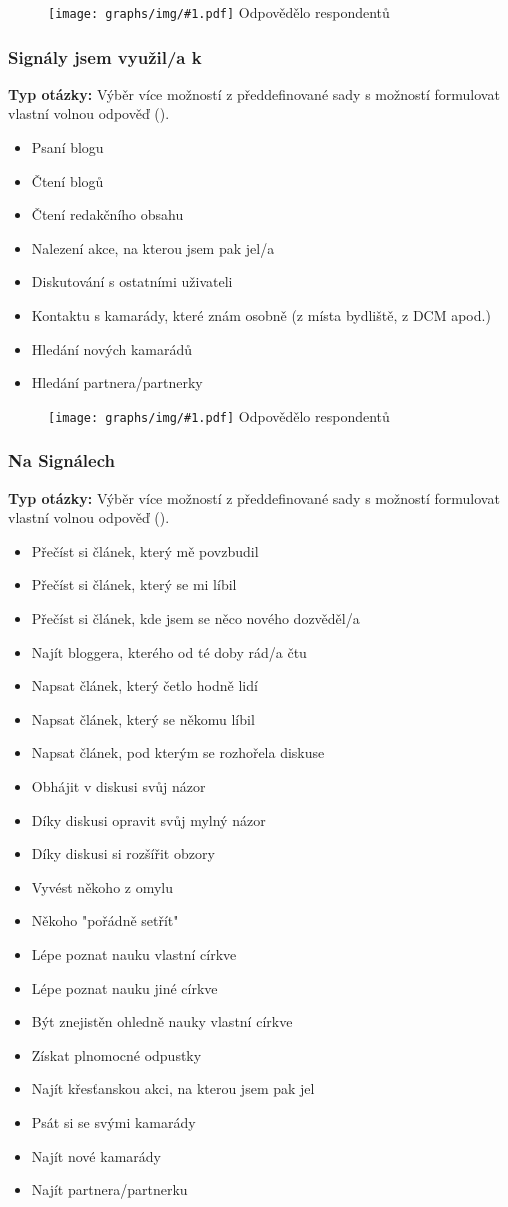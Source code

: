 \documentclass[12pt, a4paper, twoside]{article}
\newcommand{\answercount}[1]{Odpovědělo  respondentů}
\newcommand{\includegraph}[2]{
  \begin{figure}[H]
    \centering
    \textbf{#2}
    \texttt{[image: graphs/img/\#1.pdf]}
    \answercount{#1}
  \end{figure}
}
\newcommand{\qtype}{\textbf{Typ otázky:}
}
\newcommand{\pickMultiple}{Výběr více možností z předdefinované sady\xspace}
\newcommand{\withOther}{s možností formulovat vlastní volnou odpověď (\uv{Jiné})\xspace}
\begin{document}
\includegraph{na_signaly_chodim_hlavne}{}

\subsubsection{Signály jsem využil/a k}

\qtype \pickMultiple \withOther.

\begin{itemize}
\item Psaní blogu
\item Čtení blogů
\item Čtení redakčního obsahu
\item Nalezení akce, na kterou jsem pak jel/a
\item Diskutování s ostatními uživateli
\item Kontaktu s kamarády, které znám osobně (z místa bydliště, z DCM apod.)
\item Hledání nových kamarádů
\item Hledání partnera/partnerky
\end{itemize}

\includegraph{signaly_jsem_vyuzil_k}{}

\subsubsection{Na Signálech }

\qtype \pickMultiple \withOther.

\begin{itemize}
\item Přečíst si článek, který mě povzbudil
\item Přečíst si článek, který se mi líbil
\item Přečíst si článek, kde jsem se něco nového dozvěděl/a
\item Najít bloggera, kterého od té doby rád/a čtu
\item Napsat článek, který četlo hodně lidí
\item Napsat článek, který se někomu líbil
\item Napsat článek, pod kterým se rozhořela diskuse
\item Obhájit v diskusi svůj názor
\item Díky diskusi opravit svůj mylný názor
\item Díky diskusi si rozšířit obzory
\item Vyvést někoho z omylu
\item Někoho "pořádně setřít"
\item Lépe poznat nauku vlastní církve
\item Lépe poznat nauku jiné církve
\item Být znejistěn ohledně nauky vlastní církve
\item Získat plnomocné odpustky
\item Najít křesťanskou akci, na kterou jsem pak jel
\item Psát si se svými kamarády
\item Najít nové kamarády
\item Najít partnera/partnerku
\end{itemize}
\end{document}
